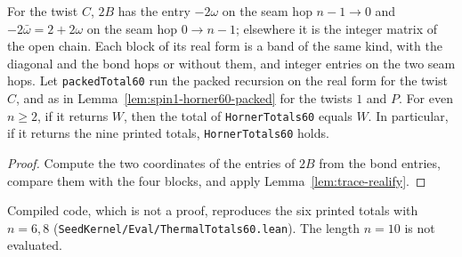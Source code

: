 \begin{lemma}
  \label{lem:spin1-horner60-packed-c}
  \leanok
  For the twist \(C\), \(2B\) has the entry \(-2\omega\) on the seam hop \(n-1\to0\) and
  \(-2\bar\omega=2+2\omega\) on the seam hop \(0\to n-1\); elsewhere it is the integer matrix of
  the open chain. Each block of its real form is a band of the same kind, with the diagonal
  and the bond hops or without them, and integer entries on the two seam hops. Let
  \texttt{packedTotal60} run the packed recursion on the real form for the twist \(C\), and as
  in Lemma~\ref{lem:spin1-horner60-packed} for the twists \(1\) and \(P\). For even
  \(n \ge 2\), if it returns \(W\), then the total of \texttt{HornerTotals60} equals \(W\). In
  particular, if it returns the nine printed totals, \texttt{HornerTotals60} holds.
\end{lemma}
\begin{proof}
  \leanok
  Compute the two coordinates of the entries of \(2B\) from the bond entries, compare them
  with the four blocks, and apply Lemma~\ref{lem:trace-realify}.
\end{proof}

Compiled code, which is not a proof, reproduces the six printed totals with \(n = 6, 8\)
(\texttt{SeedKernel/Eval/ThermalTotals60.lean}). The length \(n = 10\) is not evaluated.

